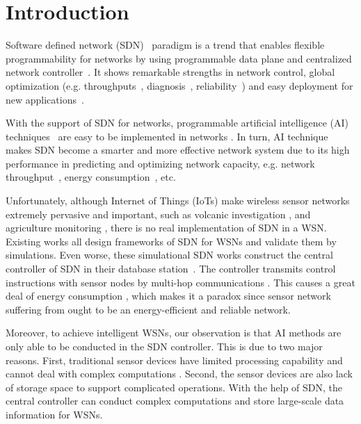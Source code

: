 \section{Introduction}


Software defined network (SDN)~\cite{Benzekki2016Software,Sezer2013Are} paradigm
is a trend that enables flexible programmability for networks 
by using programmable data plane and centralized network controller~\cite{7122247}.
It shows remarkable strengths in network control, global optimization 
(e.g. throughputs~\cite{}, diagnosis~\cite{}, reliability~\cite{})
and easy deployment for new applications~\cite{Feamster2014The}.

With the support of SDN for networks, programmable artificial intelligence (AI) 
techniques~\cite{Norvig1995Artificial, Poole2010Artificial, Cockburn1996ARCHON} 
are easy to be implemented in networks \cite{}.
In turn, AI technique makes SDN become a smarter and more effective network system
due to its high performance in predicting and optimizing network capacity\cite{},
e.g. network throughput~\cite{}, energy consumption~\cite{}, etc.
 
Unfortunately, although Internet of Things (IoTs) \cite{Atzori2010The} 
make wireless sensor networks \cite{Potdar2009Wireless}
extremely pervasive and important, such as volcanic investigation 
\cite{Wernerallen2006Deploying}, and agriculture monitoring \cite{Wang2010L3SN}, 
there is no real implementation of SDN in a WSN. Existing works 
 \cite{mahmud2011exploitation, costanzo2012software, luo2012sensor, de2015tinysdn, galluccio2015sdn} 
all design frameworks of SDN for WSNs and validate them by simulations.  
Even worse, these simulational SDN works construct the central controller 
of SDN in their database station~\cite{}. The controller transmits control 
instructions with sensor nodes by multi-hop communications \cite{Mizuyama2017Estimation}.
This causes a great deal of energy consumption \cite{Yang2014}, which 
makes it a paradox since sensor network suffering from ought to be an energy-efficient and reliable network.

Moreover, to achieve intelligent WSNs, 
our observation is that AI methods 
are only able to be conducted in the SDN controller. 
This is due to two major reasons. 
First, traditional sensor devices 
have limited processing capability and cannot 
deal with complex computations \cite{Sharma2012Security,Heller2012The}.
Second, the sensor devices are also lack of storage space 
to support complicated operations. With the help of SDN, 
the central controller can conduct complex computations 
and store large-scale data information for WSNs.

